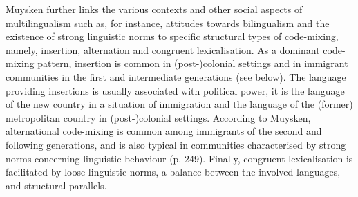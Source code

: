 Muysken further links the various contexts and other social aspects of multilingualism such as, for instance, attitudes towards bilingualism and the existence of strong linguistic norms to specific structural types of code-mixing, namely, insertion, alternation and congruent lexicalisation. As a dominant code-mixing pattern, insertion is common in (post-)colonial settings and in immigrant communities in the first and intermediate generations (see below). The language providing insertions is usually associated with political power, it is the language of the new country in a situation of immigration and the language of the (former) metropolitan country in (post-)colonial settings. According to Muysken, alternational code-mixing is common among immigrants of the second and following generations, and is also typical in communities characterised by strong norms concerning linguistic behaviour (p. 249). Finally, congruent lexicalisation is facilitated by loose linguistic norms, a balance between the involved languages, and structural parallels.

